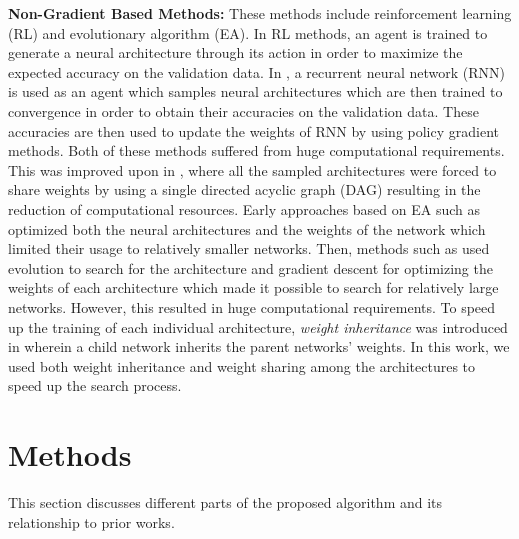 \documentclass[final]{cvpr}
\begin{document}
\textbf{Non-Gradient Based Methods:} These methods include reinforcement learning (RL) and evolutionary algorithm (EA). In RL methods, an agent is trained to generate a neural architecture
through its action in order to maximize the expected accuracy on the validation data. In
\cite{zoph2016neural}\cite{zoph2018learning}, a recurrent neural network (RNN) is used as an agent
which samples neural architectures which are then trained to convergence in order to obtain their
accuracies on the validation data. These accuracies are then used to update the weights of RNN by
using policy gradient methods. Both of these methods suffered from huge computational requirements.
This was improved upon in \cite{pmlr-v80-pham18a}, where all the sampled architectures were forced
to share weights by using a single directed acyclic graph (DAG) resulting in the reduction of
computational resources. Early approaches based on EA such as
\cite{stanley2002evolving}\cite{stanley2009hypercube} optimized both the neural architectures and
the weights of the network which limited their usage to relatively smaller networks. Then, methods
such as \cite{xie2017genetic}\cite{real2019regularized} used evolution to search for the
architecture and gradient descent for optimizing the weights of each architecture which made it
possible to search for relatively large networks. However, this resulted in huge computational
requirements. To speed up the training of each individual architecture, \textit{weight inheritance}
was introduced in \cite{real2017large} wherein a child network inherits the parent networks'
weights. In this work, we used both weight inheritance and weight sharing among the architectures
to speed up the search process.

\section{Methods}
\label{methods}
This section discusses different parts of the proposed algorithm and its relationship to prior works.
\end{document}
